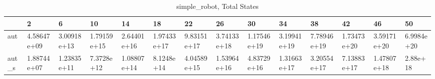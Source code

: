\begin{table}
\caption{simple_robot, Total States}
\label{simple_robot_total}
\begin{tabular}{llllllllllllll}
\toprule
 & 2 & 6 & 10 & 14 & 18 & 22 & 26 & 30 & 34 & 38 & 42 & 46 & 50 \\
\midrule
aut & 4.58647e+09 & 3.00918e+13 & 1.79159e+15 & 2.64401e+16 & 1.97433e+17 & 9.83151e+17 & 3.74133e+18 & 1.17546e+19 & 3.19941e+19 & 7.78946e+19 & 1.73473e+20 & 3.59171e+20 & 6.9984e+20 \\
aut_s & 1.88744e+07 & 1.23835e+11 & 7.3728e+12 & 1.08807e+14 & 8.1248e+14 & 4.04589e+15 & 1.53964e+16 & 4.83729e+16 & 1.31663e+17 & 3.20554e+17 & 7.13883e+17 & 1.47807e+18 & 2.88e+18 \\
\bottomrule
\end{tabular}
\end{table}
